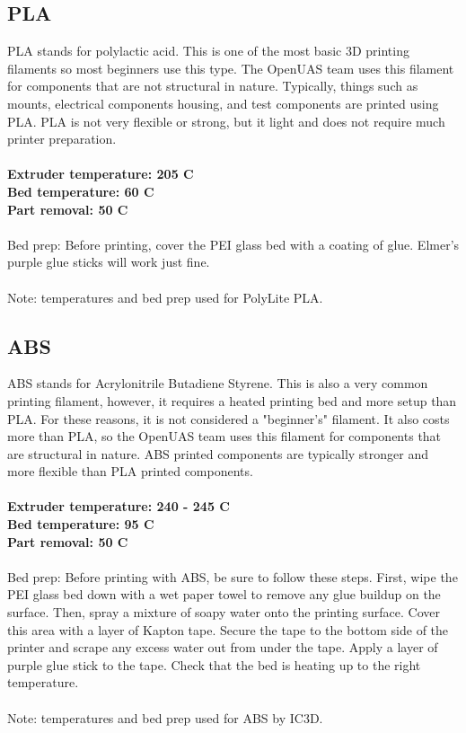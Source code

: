 \documentclass{article}
\begin{document}
\subsection*{PLA}

PLA stands for polylactic acid. This is one of the most basic 3D printing filaments so most beginners use this type. The OpenUAS team uses this filament for components that are not structural in nature. Typically, things such as mounts, electrical components housing, and test components are printed using PLA. PLA is not very flexible or strong, but it light and does not require much printer preparation. \\\\
\textbf{Extruder temperature: 205 \degree C}\\
\textbf{Bed temperature: 60 \degree C}\\
\textbf{Part removal: 50 \degree C}\\\\
Bed prep: Before printing, cover the PEI glass bed with a coating of glue. Elmer's purple glue sticks will work just fine. \\\\
Note: temperatures and bed prep used for PolyLite PLA.

\subsection*{ABS}

ABS stands for Acrylonitrile Butadiene Styrene. This is also a very common printing filament, however, it requires a heated printing bed and more setup than PLA. For these reasons, it is not considered a "beginner's" filament. It also costs more than PLA, so the OpenUAS team uses this filament for components that are structural in nature. ABS printed components are typically stronger and more flexible than PLA printed components.\\\\
\textbf{Extruder temperature: 240 - 245 \degree C}\\
\textbf{Bed temperature: 95 \degree C}\\
\textbf{Part removal: 50 \degree C}\\\\
Bed prep: Before printing with ABS, be sure to follow these steps. First, wipe the PEI glass bed down with a wet paper towel to remove any glue buildup on the surface. Then, spray a mixture of soapy water onto the printing surface. Cover this area with a layer of Kapton tape. Secure the tape to the bottom side of the printer and scrape any excess water out from under the tape. Apply a layer of purple glue stick to the tape. Check that the bed is heating up to the right temperature. \\\\
Note: temperatures and bed prep used for ABS by IC3D.
\end{document}
